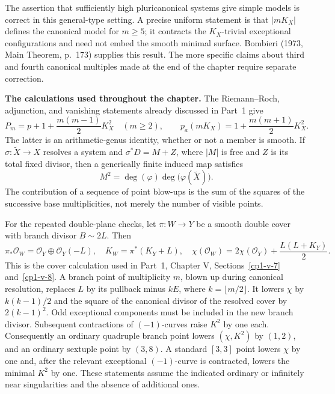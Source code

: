 The assertion that sufficiently high pluricanonical systems give simple models is correct in this general-type setting. A precise uniform statement is that \(|mK_X|\) defines the canonical model for \(m\geq5\); it contracts the \(K_X\)-trivial exceptional configurations and need not embed the smooth minimal surface. Bombieri (1973, Main Theorem, p.~173) supplies this result. The more specific claims about third and fourth canonical multiples made at the end of the chapter require separate correction.

\textbf{The calculations used throughout the chapter.}
The Riemann--Roch, adjunction, and vanishing statements already discussed in Part~1 give
\begin{equation}
P_m=p+1+\frac{m(m-1)}2K_X^2\quad(m\geq2),
\qquad
p_a(mK_X)=1+\frac{m(m+1)}2K_X^2.
\label{cp2-viii-plurigenera}
\end{equation}
The latter is an arithmetic-genus identity, whether or not a member is smooth. If \(\sigma:\widetilde X\to X\) resolves a system and \(\sigma^*D=M+Z\), where \(|M|\) is free and \(Z\) is its total fixed divisor, then a generically finite induced map satisfies
\begin{equation}
M^2=\deg(\varphi)\deg\bigl(\varphi(\widetilde X)\bigr).
\label{cp2-viii-moving-degree}
\end{equation}
The contribution of a sequence of point blow-ups is the sum of the squares of the successive base multiplicities, not merely the number of visible points.

For the repeated double-plane checks, let \(\pi:W\to Y\) be a smooth double cover with branch divisor \(B\sim2L\). Then
\begin{equation}
\pi_*\mathcal O_W=\mathcal O_Y\oplus\mathcal O_Y(-L),\quad
K_W=\pi^*(K_Y+L),\quad
\chi(\mathcal O_W)=2\chi(\mathcal O_Y)+\frac{L(L+K_Y)}2.
\label{cp2-viii-double-cover}
\end{equation}
This is the cover calculation used in Part~1, Chapter V, Sections~\ref{cp1-v-7} and~\ref{cp1-v-8}. A branch point of multiplicity \(m\), blown up during canonical resolution, replaces \(L\) by its pullback minus \(kE\), where \(k=\lfloor m/2\rfloor\). It lowers \(\chi\) by \(k(k-1)/2\) and the square of the canonical divisor of the resolved cover by \(2(k-1)^2\). Odd exceptional components must be included in the new branch divisor. Subsequent contractions of \((-1)\)-curves raise \(K^2\) by one each. Consequently an ordinary quadruple branch point lowers \((\chi,K^2)\) by \((1,2)\), and an ordinary sextuple point by \((3,8)\). A standard \([3,3]\) point lowers \(\chi\) by one and, after the relevant exceptional \((-1)\)-curve is contracted, lowers the minimal \(K^2\) by one. These statements assume the indicated ordinary or infinitely near singularities and the absence of additional ones.

